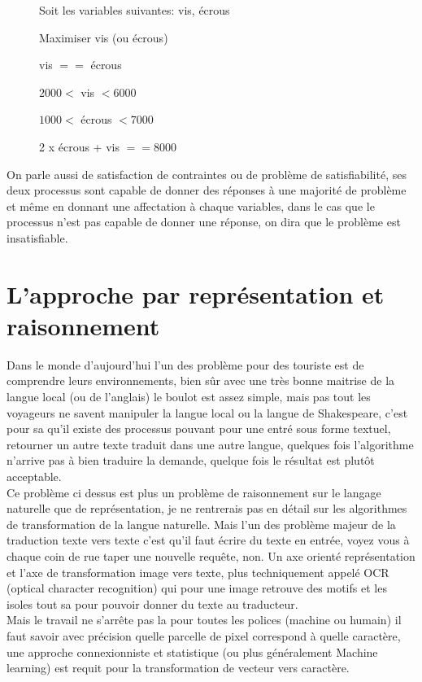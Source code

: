 \begin{description}
\item[] Soit les variables suivantes: vis, écrous
\item[] Maximiser vis (ou écrous)
\item[] vis $==$ écrous
\item[] $2000 <$ vis $< 6000$
\item[] $1000 <$ écrous $< 7000$
\item[] 2 x écrous + vis $== 8000$
\end{description}

On parle aussi de satisfaction de contraintes ou de problème de satisfiabilité, ses deux processus sont capable de donner des réponses à une majorité de problème et même en donnant une affectation à chaque variables, dans le cas que le processus n'est pas capable de donner une réponse, on dira que le problème est insatisfiable.

\pagebreak

\section{L'approche par représentation et raisonnement}

Dans le monde d'aujourd'hui l'un des problème pour des touriste est de comprendre leurs environnements, bien sûr avec une très bonne maitrise de la langue local (ou de l'anglais) le boulot est assez simple, mais pas tout les voyageurs ne savent manipuler la langue local ou la langue de Shakespeare, c'est pour sa qu'il existe des processus pouvant pour une entré sous forme textuel, retourner un autre texte traduit dans une autre langue, quelques fois l'algorithme n'arrive pas à bien traduire la demande, quelque fois le résultat est plutôt acceptable.\\
Ce problème ci dessus est plus un problème de raisonnement sur le langage naturelle que de représentation, je ne rentrerais pas en détail sur les algorithmes de transformation de la langue naturelle. Mais l'un des problème majeur de la traduction texte vers texte c'est qu'il faut écrire du texte en entrée, voyez vous à chaque coin de rue taper une nouvelle requête, non. Un axe orienté représentation et l'axe de transformation image vers texte, plus techniquement appelé OCR (optical character recognition) qui pour une image retrouve des motifs et les isoles tout sa pour pouvoir donner du texte au traducteur.\\
Mais le travail ne s'arrête pas la  pour toutes les polices (machine ou humain) il faut savoir avec précision quelle parcelle de pixel correspond à quelle caractère, une approche connexionniste et statistique (ou plus généralement Machine learning) est requit pour la transformation de vecteur vers caractère.